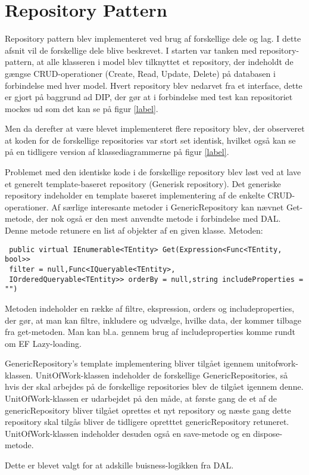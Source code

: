 \section{Repository Pattern}
Repository pattern blev implementeret ved brug af forskellige dele og lag. I dette afsnit vil de forskellige dele blive beskrevet. 
I starten var tanken med repository-pattern, at alle klasseren i model blev tilknyttet et repository, der indeholdt de gængse CRUD-operationer (Create, Read, Update, Delete) på databasen i forbindelse med hver model. Hvert repository blev nedarvet fra et interface, dette er gjort på baggrund ad DIP, der gør at i forbindelse med test kan repositoriet mockes ud som det kan se på figur \ref{label}.

Men da derefter at være blevet implementeret flere repository blev, der observeret at koden for de forskellige repositories var stort set identisk, hvilket også kan se på en tidligere version af klassediagrammerne på figur \ref{label}.

Problemet med den identiske kode i de forskellige repository blev løst ved at lave et generelt template-baseret repository (Generisk repository). Det generiske repository indeholder en template baseret implementering af de enkelte CRUD-operationer.
Af særlige interesante metoder i GenericRepository kan nævnet Get-metode, der nok også er den mest anvendte metode i forbindelse med DAL. Denne metode retunere en list af objekter af en given klasse.
Metoden:
\begin{verbatim}
 public virtual IEnumerable<TEntity> Get(Expression<Func<TEntity, bool>> 
 filter = null,Func<IQueryable<TEntity>, 
 IOrderedQueryable<TEntity>> orderBy = null,string includeProperties = "")
\end{verbatim}
Metoden indeholder en række af filtre, ekspression, orders og includeproperties, der gør, at man kan filtre, inkludere og udvælge, hvilke data, der kommer tilbage fra get-metoden. Man kan bl.a. gennem brug af includeproperties komme rundt om EF Lazy-loading. 

GenericRepository's template implementering bliver tilgået igennem unitofwork-klassen. 
UnitOfWork-klassen indeholder de forskellige GenericRepositories, så hvis der skal arbejdes på de forskellige repositories blev de tilgået igennem denne. UnitOfWork-klassen er udarbejdet på den måde, at første gang de et af de genericRepository bliver tilgået oprettes et nyt repository og næste gang dette repository skal tilgås bliver de tidligere opretttet genericRepository retuneret.
UnitOfWork-klassen indeholder desuden også en save-metode og en dispose-metode.

Dette er blevet valgt for at adskille buisness-logikken fra DAL.

